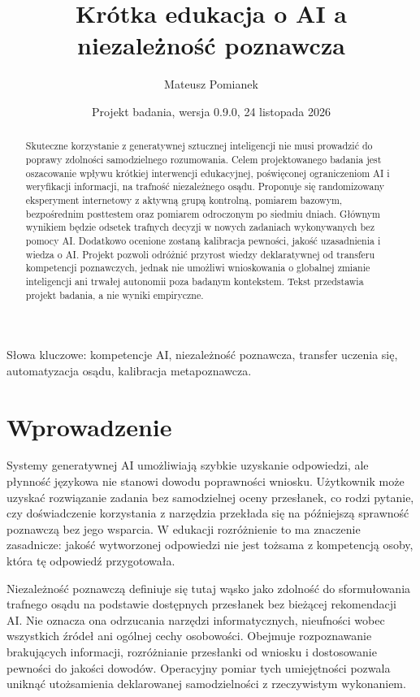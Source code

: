 \documentclass[11pt,a4paper]{article}
\title{Krótka edukacja o AI a niezależność poznawcza}
\author{Mateusz Pomianek}
\date{Projekt badania, wersja 0.9.0, 24 listopada 2026}
\begin{document}
\maketitle

\begin{abstract}
Skuteczne korzystanie z generatywnej sztucznej inteligencji nie musi prowadzić do poprawy zdolności samodzielnego rozumowania. Celem projektowanego badania jest oszacowanie wpływu krótkiej interwencji edukacyjnej, poświęconej ograniczeniom AI i weryfikacji informacji, na trafność niezależnego osądu. Proponuje się randomizowany eksperyment internetowy z aktywną grupą kontrolną, pomiarem bazowym, bezpośrednim posttestem oraz pomiarem odroczonym po siedmiu dniach. Głównym wynikiem będzie odsetek trafnych decyzji w nowych zadaniach wykonywanych bez pomocy AI. Dodatkowo ocenione zostaną kalibracja pewności, jakość uzasadnienia i wiedza o AI. Projekt pozwoli odróżnić przyrost wiedzy deklaratywnej od transferu kompetencji poznawczych, jednak nie umożliwi wnioskowania o globalnej zmianie inteligencji ani trwałej autonomii poza badanym kontekstem. Tekst przedstawia projekt badania, a nie wyniki empiryczne.
\end{abstract}

\noindent Słowa kluczowe: kompetencje AI, niezależność poznawcza, transfer uczenia się, automatyzacja osądu, kalibracja metapoznawcza.

\section{Wprowadzenie}
Systemy generatywnej AI umożliwiają szybkie uzyskanie odpowiedzi, ale płynność językowa nie stanowi dowodu poprawności wniosku. Użytkownik może uzyskać rozwiązanie zadania bez samodzielnej oceny przesłanek, co rodzi pytanie, czy doświadczenie korzystania z narzędzia przekłada się na późniejszą sprawność poznawczą bez jego wsparcia. W edukacji rozróżnienie to ma znaczenie zasadnicze: jakość wytworzonej odpowiedzi nie jest tożsama z kompetencją osoby, która tę odpowiedź przygotowała.

Niezależność poznawczą definiuje się tutaj wąsko jako zdolność do sformułowania trafnego osądu na podstawie dostępnych przesłanek bez bieżącej rekomendacji AI. Nie oznacza ona odrzucania narzędzi informatycznych, nieufności wobec wszystkich źródeł ani ogólnej cechy osobowości. Obejmuje rozpoznawanie brakujących informacji, rozróżnianie przesłanki od wniosku i dostosowanie pewności do jakości dowodów. Operacyjny pomiar tych umiejętności pozwala uniknąć utożsamienia deklarowanej samodzielności z rzeczywistym wykonaniem.
\end{document}
